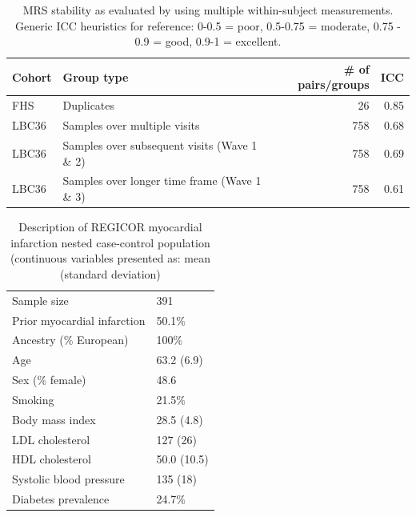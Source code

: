 \documentclass[]{article}
\begin{document}
\newpage

\begin{longtable}{llrr}
\caption{\label{tab:stability}MRS stability as evaluated by using multiple within-subject measurements. Generic ICC heuristics for reference: 0-0.5 = poor, 0.5-0.75 = moderate, 0.75 - 0.9 = good, 0.9-1 = excellent.}\\
\toprule
Cohort & Group type & \# of pairs/groups & ICC\\
\midrule
FHS & Duplicates & 26 & 0.85\\
LBC36 & Samples over multiple visits & 758 & 0.68\\
LBC36 & Samples over subsequent visits (Wave 1 \& 2) & 758 & 0.69\\
LBC36 & Samples over longer time frame (Wave 1 \& 3) & 758 & 0.61\\
\bottomrule
\end{longtable}

\begin{longtable}{ll}
\caption{\label{tab:regicor-description}Description of REGICOR myocardial infarction nested case-control population (continuous variables presented as: mean (standard deviation)}\\
\toprule
Sample size & 391\\
Prior myocardial infarction & 50.1\%\\
Ancestry (\% European) & 100\%\\
Age & 63.2 (6.9)\\
Sex (\% female) & 48.6\\
Smoking & 21.5\%\\
Body mass index & 28.5 (4.8)\\
LDL cholesterol & 127 (26)\\
HDL cholesterol & 50.0 (10.5)\\
Systolic blood pressure & 135 (18)\\
Diabetes prevalence & 24.7\%\\
\bottomrule
\end{longtable}

\newpage
\end{document}
